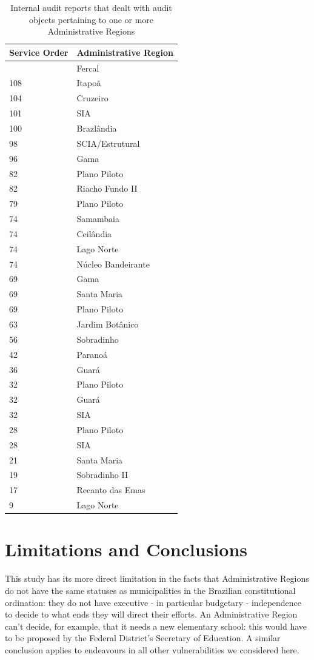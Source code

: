 \documentclass[conference]{IEEEtran}
\begin{document}
\begin{table}[H]
\centering
\begin{tabular}{l|l}
\hline
Service Order & Administrative Region \\
\hline
\centering
109 & Fercal \\
108 & Itapoã \\
104 & Cruzeiro \\
101 & SIA \\
100 & Brazlândia \\
98 & SCIA/Estrutural \\
96 & Gama \\
82 & Plano Piloto \\
82 & Riacho Fundo II \\
79 & Plano Piloto \\
74 & Samambaia \\
74 & Ceilândia \\
74 & Lago Norte \\
74 & Núcleo Bandeirante \\
69 & Gama \\
69 & Santa Maria \\
69 & Plano Piloto \\
63 & Jardim Botânico \\
56 & Sobradinho \\
42 & Paranoá \\
36 & Guará \\
32 & Plano Piloto \\
32 & Guará \\
32 & SIA \\
28 & Plano Piloto \\
28 & SIA \\
21 & Santa Maria \\
19 & Sobradinho II \\
17 & Recanto das Emas \\
9 & Lago Norte \\
\end{tabular}
\label{tab:auditorias-2022}
\caption{Internal audit reports that dealt with audit objects pertaining to one or more Administrative Regions}

\end{table}


\section{Limitations and Conclusions}

This study has its more direct limitation in the facts that Administrative Regions do not have the same statuses as municipalities in the Brazilian constitutional ordination: they do not have executive - in particular budgetary - independence to decide to what ends they will direct their efforts. An Administrative Region can't decide, for example, that it needs a new elementary school: this would have to be proposed by the Federal District's Secretary of Education. A similar conclusion applies to endeavours in all other vulnerabilities we considered here. 
\end{document}
